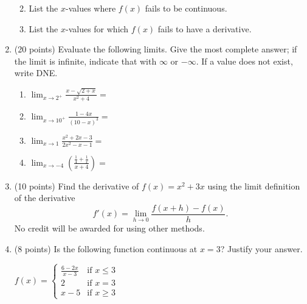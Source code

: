 \documentclass[12pt]{article}
\begin{document}
\begin{enumerate}
\begin{enumerate}
\vspace{1cm}
\item List the $x$-values where $f(x)$ fails to be continuous.\\
\vfill
\item List the $x$-values for which $f(x)$ fails to have a derivative.\\\vfill
\vspace{\mysep}
\end{enumerate}
\newpage
\item (20 points)  Evaluate the following limits. Give the most complete answer; if the limit is infinite, indicate that with $\infty$ or $-\infty.$ If a value does not exist, write DNE.\\
	\begin{enumerate}
	\item $\displaystyle{\lim_{x \to 2^+ }  \frac{x-\sqrt{2+x}}{x^2+4}=}$
	\vfill
	\item $\displaystyle{\lim_{x  \to 10^+} \frac{1-4x}{(10-x)^3}=}$
	\vfill
	\item $\displaystyle{\lim_{x \to 1 } \frac{x^2+2x-3}{2x^2-x-1} =}$
	\vfill
	\item $\displaystyle{\lim_{x \to -4} \left(\frac{\frac{1}{4} + \frac{1}{x}}{x+4} \right)=}$
	\vfill
	\end{enumerate}
\newpage

\item (10 points) Find the derivative of $f(x) = x^2 + 3x$  using the limit definition of the derivative $$f'(x)=\displaystyle{\lim_{h \rightarrow 0}\frac{f(x+h)-f(x)}{h}}.$$ No credit will be awarded for using other methods.
\newpage
\item (8 points) Is the following function continuous at $x=3$? Justify your answer. 

$
f(x) = \begin{cases}
\frac{6-2x}{x-3} & \text{if } x \leq 3\\
2  & \text{if } x =3\\
x-5  & \text{if } x \geq 3
\end{cases}
$

\vfill

%


\end{enumerate}
\end{document}
